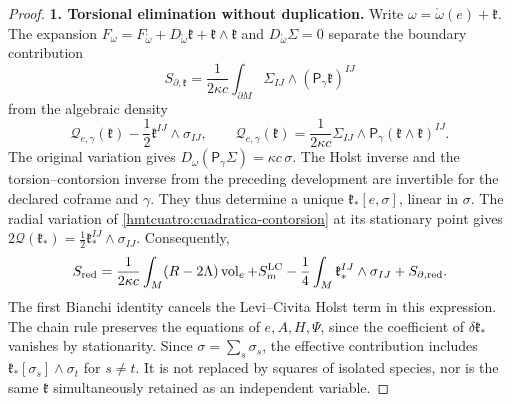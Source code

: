 \begin{proof}
\par\medskip\noindent\textbf{1. Torsional elimination without duplication.}\quad
Write \(\omega=\mathring\omega(e)+\mathfrak k\). The expansion \(F_\omega=F_{\mathring\omega}
+D_{\mathring\omega}\mathfrak k+\mathfrak k\wedge\mathfrak k\) and \(D_{\mathring\omega}\Sigma=0\) separate the boundary contribution
\[
 S_{\partial,\mathfrak k}
 =\frac1{2\kappa c}\int_{\partial M}
                  \Sigma_{IJ}\wedge(\mathsf P_\gamma\mathfrak k)^{IJ}
\]
from the algebraic density
\begin{equation}
 \mathcal Q_{e,\gamma}(\mathfrak k)
       -\frac12\mathfrak k^{IJ}\wedge\sigma_{IJ},\qquad
 \mathcal Q_{e,\gamma}(\mathfrak k)=\frac1{2\kappa c}
       \Sigma_{IJ}\wedge
       \mathsf P_\gamma(\mathfrak k\wedge\mathfrak k)^{IJ}.
 \label{hmtcuatro:cuadratica-contorsion}
\end{equation}
The original variation gives \(D_\omega(\mathsf P_\gamma\Sigma)=\kappa c\,\sigma\). The Holst inverse and the torsion--contorsion inverse from the preceding development are invertible for the declared coframe and \(\gamma\). They thus determine a unique \(\mathfrak k_*[e,\sigma]\), linear in \(\sigma\). The radial variation of \eqref{hmtcuatro:cuadratica-contorsion} at its stationary point gives \(2\mathcal Q(\mathfrak k_*)=\frac12\mathfrak k_*^{IJ}\wedge\sigma_{IJ}\). Consequently,
\begin{equation}
 S_{\rm red}=\frac1{2\kappa c}\int_M(R-2\Lambda)\operatorname{vol}_e
       +S_m^{\rm LC}
       -\frac14\int_M\mathfrak k_*^{IJ}\wedge\sigma_{IJ}
       +S_{\partial,\rm red}.
 \label{hmtcuatro:accion-reducida}
\end{equation}
The first Bianchi identity cancels the Levi--Civita Holst term in this expression. The chain rule preserves the equations of \(e,A,H,\Psi\), since the coefficient of \(\delta\mathfrak k_*\) vanishes by stationarity. Since \(\sigma=\sum_s\sigma_s\), the effective contribution includes \(\mathfrak k_*[\sigma_s]\wedge\sigma_t\) for \(s\ne t\). It is not replaced by squares of isolated species, nor is the same \(\mathfrak k\) simultaneously retained as an independent variable.


\end{proof}
